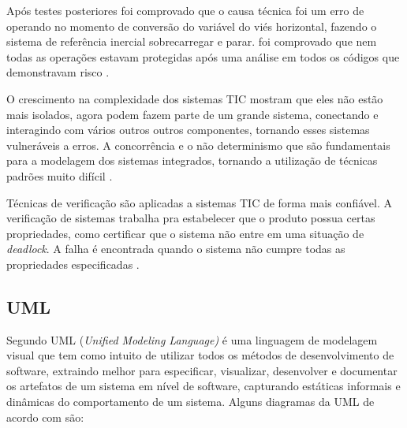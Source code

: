 Após testes posteriores foi comprovado que o causa técnica foi um erro de operando no momento de conversão do variável do viés horizontal, fazendo o sistema de referência inercial sobrecarregar e parar. foi comprovado que nem todas as operações estavam protegidas após uma análise em todos os códigos que demonstravam risco \cite{lions1996ariane}. 


O crescimento na complexidade dos sistemas TIC mostram que eles não estão mais isolados, agora podem fazem parte de um grande sistema, conectando e interagindo com vários outros outros componentes, tornando esses sistemas vulneráveis a erros. 
A concorrência e o não determinismo que são fundamentais para a modelagem dos sistemas integrados, tornando a utilização de técnicas padrões muito difícil \cite{Baier:2008}.

Técnicas de verificação são aplicadas a sistemas TIC de forma mais confiável. A verificação de sistemas trabalha pra estabelecer que o produto possua certas propriedades, como certificar que o sistema não entre em uma situação de \textit{deadlock}. A falha é encontrada quando o sistema não cumpre todas as propriedades especificadas \cite{Baier:2008}.



\subsection{UML}

Segundo  UML (\textit{Unified Modeling Language)} é uma linguagem de modelagem visual que tem como intuito de utilizar todos os métodos de desenvolvimento de software, extraindo melhor para especificar, visualizar, desenvolver e documentar os artefatos de um sistema em nível de software, capturando estáticas informais e dinâmicas do comportamento de um sistema. Alguns diagramas da UML de acordo com  são:

